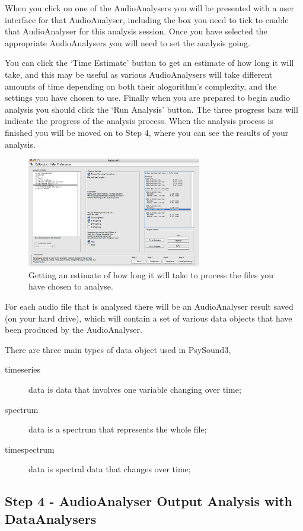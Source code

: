 \documentclass{article}
\begin{document}
When you click on one of the AudioAnalysers you will be presented with a user interface for that AudioAnalyser, including the box you need to tick to enable that AudioAnalyser for this analysis session. Once you have selected the appropriate AudioAnalysers you will need to set the analysis going. 

You can click the `Time Estimate' button to get an estimate of how long it will take, and this may be useful as various AudioAnalysers will take different amounts of time depending on both their alogorithm's complexity, and the settings you have chosen to use. Finally when you are prepared to begin audio analysis you should click the `Run Analysis' button. The three progress bars will indicate the progress of the analysis process. When the analysis process is finished you will be moved on to Step 4, where you can see the results of your analysis.

\begin{figure}[htbp]
	\centering
		\includegraphics[width=3in]{Step3-TimeEstimate.jpg}
	\caption{Getting an estimate of how long it will take to process the files you have chosen to analyse.}
	\label{fig:stage10}
\end{figure}

For each audio file that is analysed there will be an AudioAnalyser result saved (on your hard drive), which will contain a set of various data objects that have been produced by the AudioAnalyser. 

There are three main types of data object used in PsySound3,
\begin{description}
 	\item[timeseries] data is data that involves one variable changing over time;
	\item[spectrum] data is a spectrum that represents the whole file; 
	\item[timespectrum] data is spectral data that changes over time;
\end{description}

\subsection{Step 4 - AudioAnalyser Output Analysis with DataAnalysers}
\end{document}
